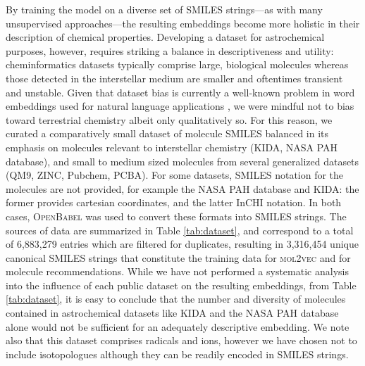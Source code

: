 \documentclass[twocolumn]{aastex63}
\begin{document}
By training the model on a diverse set of SMILES strings---as with many unsupervised approaches---the resulting embeddings become more holistic in their description of chemical properties. Developing a dataset for astrochemical purposes, however, requires striking a balance in descriptiveness and utility: cheminformatics datasets typically comprise large, biological molecules whereas those detected in the interstellar medium are smaller and oftentimes transient and unstable. Given that dataset bias is currently a well-known problem in word embeddings used for natural language applications \citep{bolukbasi_man_2016,basta_evaluating_2019}, we were mindful not to bias toward terrestrial chemistry albeit only qualitatively so. For this reason, we curated a comparatively small dataset of molecule SMILES balanced in its emphasis on molecules relevant to interstellar chemistry (KIDA, NASA PAH database), and small to medium sized molecules from several generalized datasets (QM9, ZINC, Pubchem, PCBA). For some datasets, SMILES notation for the molecules are not provided, for example the NASA PAH database and KIDA: the former provides cartesian coordinates, and the latter InCHI notation. In both cases, \textsc{OpenBabel} \citep{oboyle_open_2011} was used to convert these formats into SMILES strings. The sources of data are summarized in Table \ref{tab:dataset}, and correspond to a total of 6,883,279 entries which are filtered for duplicates, resulting in 3,316,454 unique canonical SMILES strings that constitute the training data for \textsc{mol2vec} and for molecule recommendations. While we have not performed a systematic analysis into the influence of each public dataset on the resulting embeddings, from Table \ref{tab:dataset}, it is easy to conclude that the number and diversity of molecules contained in astrochemical datasets like KIDA and the NASA PAH database alone would not be sufficient for an adequately descriptive embedding. We note also that this dataset comprises radicals and ions, however we have chosen not to include isotopologues although they can be readily encoded in SMILES strings.
\end{document}
